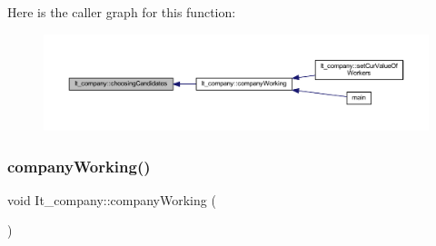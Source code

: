 Here is the caller graph for this function\+:
\nopagebreak
\begin{figure}[H]
\begin{center}
\leavevmode
\includegraphics[width=350pt]{class_it__company_aead10e44d7215787e8e532e2e0463d0d_icgraph}
\end{center}
\end{figure}
\hypertarget{class_it__company_a57d8e8056fb6753cef0a6acd80a801dd}{}\label{class_it__company_a57d8e8056fb6753cef0a6acd80a801dd} 
\subsubsection{\texorpdfstring{company\+Working()}{companyWorking()}}
{\footnotesize\ttfamily void It\+\_\+company\+::company\+Working (\begin{DoxyParamCaption}{ }\end{DoxyParamCaption})}

